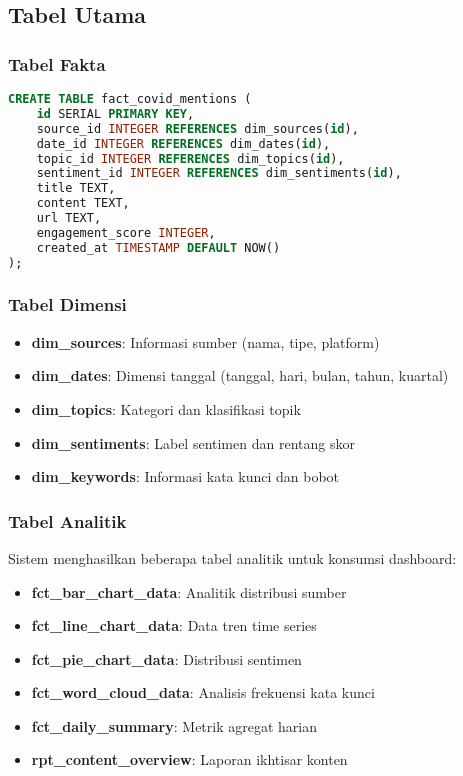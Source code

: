 \documentclass[12pt,a4paper]{article}
\begin{document}
\subsection{Tabel Utama}

\subsubsection{Tabel Fakta}
\begin{lstlisting}[language=sql, caption=Skema Tabel Fakta]
CREATE TABLE fact_covid_mentions (
    id SERIAL PRIMARY KEY,
    source_id INTEGER REFERENCES dim_sources(id),
    date_id INTEGER REFERENCES dim_dates(id),
    topic_id INTEGER REFERENCES dim_topics(id),
    sentiment_id INTEGER REFERENCES dim_sentiments(id),
    title TEXT,
    content TEXT,
    url TEXT,
    engagement_score INTEGER,
    created_at TIMESTAMP DEFAULT NOW()
);
\end{lstlisting}

\subsubsection{Tabel Dimensi}
\begin{itemize}
    \item \textbf{dim\_sources}: Informasi sumber (nama, tipe, platform)
    \item \textbf{dim\_dates}: Dimensi tanggal (tanggal, hari, bulan, tahun, kuartal)
    \item \textbf{dim\_topics}: Kategori dan klasifikasi topik
    \item \textbf{dim\_sentiments}: Label sentimen dan rentang skor
    \item \textbf{dim\_keywords}: Informasi kata kunci dan bobot
\end{itemize}

\subsubsection{Tabel Analitik}
Sistem menghasilkan beberapa tabel analitik untuk konsumsi dashboard:
\begin{itemize}
    \item \textbf{fct\_bar\_chart\_data}: Analitik distribusi sumber
    \item \textbf{fct\_line\_chart\_data}: Data tren time series
    \item \textbf{fct\_pie\_chart\_data}: Distribusi sentimen
    \item \textbf{fct\_word\_cloud\_data}: Analisis frekuensi kata kunci
    \item \textbf{fct\_daily\_summary}: Metrik agregat harian
    \item \textbf{rpt\_content\_overview}: Laporan ikhtisar konten
\end{itemize}
\end{document}
